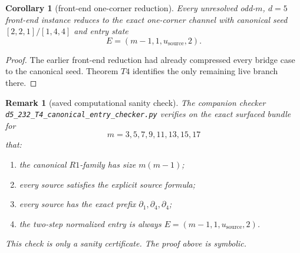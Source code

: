 \documentclass[11pt]{article}
\newtheorem{remark}[theorem]{Remark}
\newtheorem{corollary}[theorem]{Corollary}
\newcommand{\CanSeed}{[2,2,1]/[1,4,4]}
\begin{document}
\begin{corollary}[front-end one-corner reduction]
Every unresolved odd-\(m\), \(d=5\) front-end instance reduces to the exact
one-corner channel with canonical seed \(\CanSeed\) and entry state
\[
E=(m-1,1,u_{\mathrm{source}},2).
\]
\end{corollary}

\begin{proof}
The earlier front-end reduction had already compressed every bridge case to the
canonical seed.  Theorem \(T4\) identifies the only remaining live branch there.
\end{proof}

\begin{remark}[saved computational sanity check]
The companion checker
\texttt{d5\_232\_T4\_canonical\_entry\_checker.py} verifies on the exact surfaced
bundle for
\[
m=3,5,7,9,11,13,15,17
\]
that:
\begin{enumerate}[label=\textup{(\arabic*)},leftmargin=2.8em]
\item the canonical \(R1\)-family has size \(m(m-1)\);
\item every source satisfies the explicit source formula;
\item every source has the exact prefix \(\partial_1,\partial_4,\partial_4\);
\item the two-step normalized entry is always
      \(E=(m-1,1,u_{\mathrm{source}},2)\).
\end{enumerate}
This check is only a sanity certificate.  The proof above is symbolic.
\end{remark}
\end{document}
